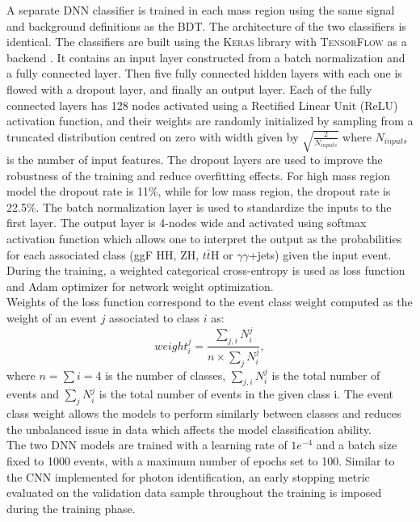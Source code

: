 A separate DNN classifier is trained in each mass region using the same signal and background definitions as the BDT. The architecture of the two classifiers is identical. The classifiers are built using the \textsc{Keras} library with \textsc{TensorFlow} as a backend \cite{keras,tensorflow}. It contains an input layer constructed from a batch normalization and a fully connected layer. Then five fully connected hidden layers with each one is flowed with a dropout layer, and finally an output layer. Each of the fully connected layers has 128 nodes activated using a Rectified Linear Unit (ReLU) activation function, and their weights are randomly initialized by sampling from a truncated distribution centred on zero with width given by $\sqrt{\frac{2}{N_{inputs}}}$ where $N_{inputs}$ is the number of input features. The dropout layers are used to improve the robustness of the training and reduce overfitting effects. For high mass region model the dropout rate is 11\%, while for low mass region, the dropout rate is 22.5\%. The batch normalization layer is used to standardize the inputs to the first layer. The output layer is 4-nodes wide and activated using softmax activation function which allows one to interpret the output as the probabilities for each associated class (ggF HH, ZH, $t\bar{t}$H or $\gamma\gamma$+jets) given the input event. During the training, a weighted categorical cross-entropy is used as loss function and Adam optimizer for network weight optimization.\\
Weights of the loss function correspond to the event class weight computed as the weight of an event $j$ associated to class $i$ as:
\begin{equation}
    weight_i^j = \frac{\sum_{j,i} N_i^j}{n\times\sum_{j} N_i^j},
\end{equation}
where $n=\sum i = 4$ is the number of classes, $\sum_{j,i} N_i^j$ is the total number of events and $\sum_{j} N_i^j$ is the total number of events in the given class i. The event class weight allows the models to perform similarly between classes and reduces the unbalanced issue in data which affects the model classification ability.\\
The two DNN models are trained with a learning rate of $1e^{-4}$ and a batch size fixed to 1000 events, with a maximum number of epochs set to 100. Similar to the CNN implemented for photon identification, an early stopping metric evaluated on the validation data sample throughout the training is imposed during the training phase.\\ 
